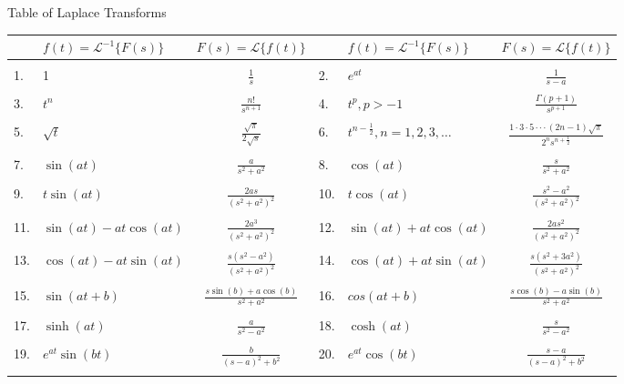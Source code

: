 \documentclass[16pt, letterpaper]{article}
\newcommand{\Lap}[1]{\mathcal{L}\{#1\}}
\newcommand{\iLap}[1]{\mathcal{L}^{-1}\{#1\}}
\newcommand\ddfrac[2]{\frac{\displaystyle #1}{\displaystyle #2}}
\begin{document}
    \begin{center}
        Table of Laplace Transforms\\
        \begin{tabular}{lp{3.5cm}c|lp{3.5cm}c}
            &\(f(t) = \iLap{F(s)}\) & \(F(s) = \Lap{f(t)}\) && \(f(t) = \iLap{F(s)}\) & \(F(s) = \Lap{f(t)}\)\\[4pt]
            \hline &&&&&\\
            1. & 1 & \(\ddfrac{1}{s}\) & 2. & \(e^{at}\) & \(\ddfrac{1}{s-a}\) \\ &&&&&\\
            3. & \(t^n\) & \(\ddfrac{n!}{s^{n+1}}\) & 4. & \(t^p, p > -1\) & \(\ddfrac{\Gamma(p+1)}{s^{p+1}}\)\\ &&&&&\\
            5. & \(\sqrt{t}\) & \(\ddfrac{\sqrt{\pi}}{2\sqrt{s}}\) & 6. & \(t^{n-\frac{1}{2}}, n=1,2,3,\dots\) & \(\ddfrac{1\cdot 3\cdot 5 \cdot \cdot \cdot (2n-1)\sqrt{\pi} }{2^ns^{n+\frac{1}{2}}}\)\\ &&&&&\\
            7. & \(\sin(at)\) & \(\ddfrac{a}{s^2+a^2}\) & 8. & \(\cos(at)\) & \(\ddfrac{s}{s^2+a^2}\) \\ &&&&&\\
            9. & \(t\sin(at)\) & \(\ddfrac{2as}{\left(s^2+a^2\right)^2}\) & 10. & \(t\cos(at)\) & \(\ddfrac{s^2-a^2}{\left(s^2+a^2\right)^2}\)\\ &&&&&\\
            11. & \(\sin(at)-at\cos(at)\) & \(\ddfrac{2a^3}{\left(s^2+a^2\right)^2}\) & 12. & \(\sin(at)+at\cos(at)\) & \(\ddfrac{2as^2}{\left(s^2+a^2\right)^2}\) \\ &&&&&\\
            13. & \(\cos(at)-at\sin(at)\) & \(\ddfrac{s\left(s^2-a^2\right)}{\left(s^2+a^2\right)^2}\) & 14. & \(\cos(at)+at\sin(at)\) & \(\ddfrac{s\left(s^2+3a^2\right)}{\left(s^2+a^2\right)^2}\)\\ &&&&&\\
            15. & \(\sin(at+b)\) & \(\ddfrac{s\sin(b)+a\cos(b)}{s^2+a^2}\) & 16. & \(cos(at+b)\) & \(\ddfrac{s\cos(b)-a\sin(b)}{s^2+a^2}\) \\ &&&&&\\
            17. & \(\sinh(at)\) & \(\ddfrac{a}{s^2-a^2}\) & 18. & \(\cosh(at)\) & \(\ddfrac{s}{s^2-a^2}\) \\ &&&&&\\
            19. & \(e^{at}\sin(bt)\) & \(\ddfrac{b}{\left(s-a\right)^2+b^2}\) & 20. & \(e^{at}\cos(bt)\) & \(\ddfrac{s-a}{\left(s-a\right)^2+b^2}\) \\ &&&&&\\

\end{tabular}
\end{center}
\end{document}
